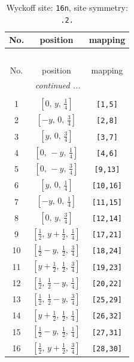 \documentclass[fleqn,8pt]{jsarticle}
\begin{document}
\begin{longtable}{ccc}
\caption{Wyckoff site: {\tt 16n}, site symmetry: {\tt .2.}}
 \\
 \hline \hline
No. & position & mapping \\ \hline \endfirsthead

\multicolumn{2}{l}{\tablename\ \thetable{}} \\
 \hline \hline
No. & position & mapping \\ \hline \endhead

 \hline \hline
\multicolumn{2}{r}{\footnotesize\it continued ...} \\ \endfoot

 \hline \hline
\multicolumn{2}{r}{} \\ \endlastfoot

1 & $\left[ 0,\, y,\, \frac{1}{4} \right]$ & {\tt [1,5]} \\ \hline
2 & $\left[ - y,\, 0,\, \frac{3}{4} \right]$ & {\tt [2,8]} \\ \hline
3 & $\left[ y,\, 0,\, \frac{3}{4} \right]$ & {\tt [3,7]} \\ \hline
4 & $\left[ 0,\, - y,\, \frac{1}{4} \right]$ & {\tt [4,6]} \\ \hline
5 & $\left[ 0,\, - y,\, \frac{3}{4} \right]$ & {\tt [9,13]} \\ \hline
6 & $\left[ y,\, 0,\, \frac{1}{4} \right]$ & {\tt [10,16]} \\ \hline
7 & $\left[ - y,\, 0,\, \frac{1}{4} \right]$ & {\tt [11,15]} \\ \hline
8 & $\left[ 0,\, y,\, \frac{3}{4} \right]$ & {\tt [12,14]} \\ \hline
9 & $\left[ \frac{1}{2},\, y + \frac{1}{2},\, \frac{1}{4} \right]$ & {\tt [17,21]} \\ \hline
10 & $\left[ \frac{1}{2} - y,\, \frac{1}{2},\, \frac{3}{4} \right]$ & {\tt [18,24]} \\ \hline
11 & $\left[ y + \frac{1}{2},\, \frac{1}{2},\, \frac{3}{4} \right]$ & {\tt [19,23]} \\ \hline
12 & $\left[ \frac{1}{2},\, \frac{1}{2} - y,\, \frac{1}{4} \right]$ & {\tt [20,22]} \\ \hline
13 & $\left[ \frac{1}{2},\, \frac{1}{2} - y,\, \frac{3}{4} \right]$ & {\tt [25,29]} \\ \hline
14 & $\left[ y + \frac{1}{2},\, \frac{1}{2},\, \frac{1}{4} \right]$ & {\tt [26,32]} \\ \hline
15 & $\left[ \frac{1}{2} - y,\, \frac{1}{2},\, \frac{1}{4} \right]$ & {\tt [27,31]} \\ \hline
16 & $\left[ \frac{1}{2},\, y + \frac{1}{2},\, \frac{3}{4} \right]$ & {\tt [28,30]} \\
\end{longtable}
\end{document}
